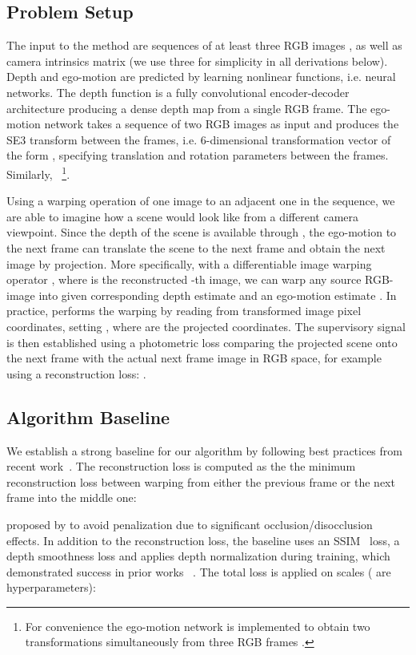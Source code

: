 \documentclass[letterpaper]{article} \usepackage{aaai19}  \usepackage{times}  \usepackage{helvet}  \usepackage{courier}  \usepackage{url}  \usepackage{graphicx}  \frenchspacing
\begin{document}
\subsection{Problem Setup}
The input to the method are sequences of at least three RGB images , as well as camera intrinsics matrix  (we use three for simplicity in all derivations below).
Depth and ego-motion are predicted by learning nonlinear functions, i.e. neural networks. The depth function  is a fully convolutional encoder-decoder architecture producing a dense depth map  from a single RGB frame. The ego-motion network  takes a sequence of two RGB images as input and produces the SE3 transform between the frames, i.e. 6-dimensional transformation vector  of the form , specifying translation and rotation parameters between the frames. Similarly, ~\footnote{For convenience the ego-motion network is implemented to obtain two transformations simultaneously from three RGB frames .}.

Using a warping operation of one image to an adjacent one in the sequence, we are able to imagine how a scene would look like from a different camera viewpoint. Since the depth of the scene is available through , the ego-motion to the next frame  can translate the scene to the next frame and obtain the next image by projection.
More specifically, with a differentiable image warping operator , where  is the reconstructed -th image,  we can warp any source RGB-image  into  given corresponding depth estimate  and an ego-motion estimate . In practice,  performs the warping by reading from transformed image pixel coordinates, setting , where  are the projected coordinates.
The supervisory signal is then established using a photometric loss comparing the projected scene onto the next frame  with the actual next frame  image in RGB space, for example using a reconstruction loss: .

\subsection{Algorithm Baseline} We establish a strong baseline for our algorithm by following best practices from recent work~\cite{zhou2017unsupervised,godard2018digging}.
The reconstruction loss is computed as the the minimum reconstruction loss between warping from either the previous frame or the next frame into the middle one:

\noindent proposed by \cite{godard2018digging} to avoid penalization due to significant occlusion/disocclusion effects.
In addition to the reconstruction loss, the baseline uses an SSIM~\cite{wang2004ssim} loss, a depth smoothness loss and applies depth normalization during training, which demonstrated success in prior works ~\cite{zhou2017unsupervised,godard2017monodepth,wang2018learning}. The total loss is applied on  scales ( are hyperparameters): \\
\end{document}
